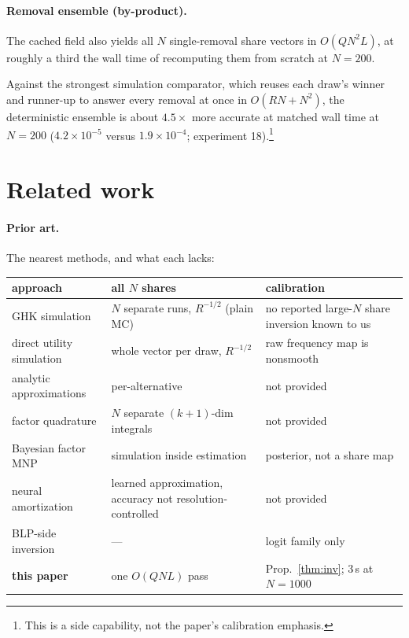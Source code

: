 \documentclass[12pt]{article}
\theoremstyle{remark}
\begin{document}
\paragraph{Removal ensemble (by-product).} The cached field also yields
all $N$ single-removal share vectors in $O(QN^2L)$, at roughly a third
the wall time of recomputing them from scratch at $N=200$.

Against the strongest simulation comparator, which reuses each draw's
winner and runner-up to answer every removal at once in $O(RN + N^2)$, the
deterministic ensemble is about $4.5\times$ more accurate at matched wall
time at $N=200$ ($4.2\times10^{-5}$ versus $1.9\times10^{-4}$;
experiment 18).\footnote{This is a side capability, not the paper's calibration emphasis.}

\section{Related work}\label{sec:related}

\paragraph{Prior art.} The nearest methods, and what each lacks:
\nopagebreak[4]

\begin{center}
\footnotesize
\setlength{\tabcolsep}{5pt}
\renewcommand{\arraystretch}{1.25}
\begin{tabular}{|p{4.1cm}|p{4.1cm}|p{4.5cm}|}
\hline
\textbf{approach} & \textbf{all $N$ shares} & \textbf{calibration} \\
\hline
GHK simulation \citep{geweke1994,hajivassiliou1998} & $N$ separate runs, $R^{-1/2}$ (plain MC) & no reported large-$N$ share inversion known to us \\
\hline
direct utility simulation & whole vector per draw, $R^{-1/2}$ & raw frequency map is nonsmooth \\
\hline
analytic approximations \citep{bhat2011,connors2014} & per-alternative & not provided \\
\hline
factor quadrature \citep{butler1982,elrod1995} & $N$ separate $(k{+}1)$-dim integrals & not provided \\
\hline
Bayesian factor MNP \citep{loaiza2022} & simulation inside estimation & posterior, not a share map \\
\hline
neural amortization \citep{huch2026} & learned approximation, accuracy not resolution-controlled & not provided \\
\hline
BLP-side inversion \citep{berry1995,conlon2020} & --- & logit family only \\
\hline
\textbf{this paper} & one $O(QNL)$ pass & Prop.~\ref{thm:inv}; 3\,s at $N{=}1000$ \\
\hline
\end{tabular}
\end{center}
\end{document}
